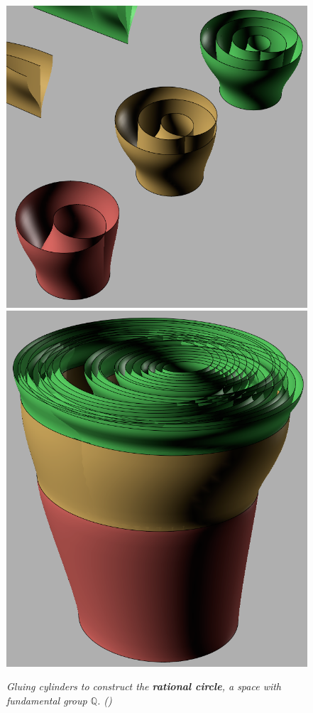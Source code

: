 \documentclass{article}
\newcommand{\Q}{\mathbb{Q}}
\begin{document}
\begin{figure}[H]
	\centering
	\includegraphics[width=0.355\linewidth]{rational-circle1}\hspace{2cm}
	\includegraphics[width=0.3\linewidth]{rational-circle2}
	\caption*{\textit{Gluing cylinders to construct the \textbf{\textit{rational circle}}, a space with fundamental group $\Q$. (\cite{rational-circle})}}
\end{figure}
\end{document}
